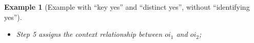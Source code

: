 \documentclass[10pt]{article}
\newtheorem{example}{Example}[section]
\begin{document}
\begin{example} [Example with ``key yes'' and ``distinct yes'', without ``identifying yes'']
\begin{itemize}
\begin{itemize}
    \item When deal with $o_2$,
        \begin{itemize}
        \item $KeyVal=1$.
        \item Create an entity instance $\langle ei_2, Tree\rangle$; $EntIdx=\{\langle o_1, 2007\rangle\rightarrow ei_1, \langle o_2, 1\rangle\rightarrow ei_2\}$.
        \item Create an observation $\langle oi_2, ei_2 \rangle$.
            No need to update $ObsIdx$ because $o_2$ is not identified as {\em distinct}.
        \item Connect $mi_2$, $mi_3$ and $mi_4$ to $oi_2$;
        \end{itemize}
    \end{itemize}
    \item Step 5 assigns the context relationship between $oi_1$ and $oi_2$;
    \end{itemize}
    

\end{example}
\end{document}
